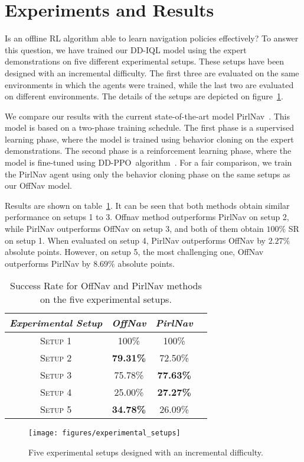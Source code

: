 \section{Experiments and Results}\label{sec:experiments}

Is an offline RL algorithm able to learn navigation policies effectively?
To answer this question, we have trained our DD-IQL model using the expert demonstrations on five different experimental setups.
These setups have been designed with an incremental difficulty.
The first three are evaluated on the same environments in which the agents were trained, while the last two are evaluated on different environments.
The details of the setups are depicted on figure~\ref{fig:setups}.

We compare our results with the current state-of-the-art model PirlNav~\cite{ramrakhya2023}.
This model is based on a two-phase training schedule.
The first phase is a supervised learning phase, where the model is trained using behavior cloning on the expert demonstrations.
The second phase is a reinforcement learning phase, where the model is fine-tuned using DD-PPO~algorithm~\cite{wijmans2020}.
For a fair comparison, we train the PirlNav agent using only the behavior cloning phase on the same setups as our OffNav model.

Results are shown on table~\ref{tab:success}.
It can be seen that both methods obtain similar performance on setups 1 to 3.
Offnav method outperforms PirlNav on setup 2, while PirlNav outperforms OffNav on setup 3, and both of them obtain $100\%$ SR on setup 1.
When evaluated on setup 4, PirlNav outperforms OffNav by $2.27\%$ absolute points.
However, on setup 5, the most challenging one, OffNav outperforms PirlNav by $8.69\%$ absolute points.


\begin{table}
    \centering
    \begin{tabular}{c|ccc}
        \toprule
        \textit{Experimental Setup} & \textit{OffNav}  & \textit{PirlNav} \\
        \midrule
        \textsc{Setup 1}            & 100\%          & 100\%   \\
        \textsc{Setup 2}            & \textbf{79.31\%} & 72.50\%          \\
        \textsc{Setup 3}            & 75.78\%          & \textbf{77.63\%} \\
        \textsc{Setup 4}            & 25.00\%          & \textbf{27.27\%} \\
        \textsc{Setup 5}            & \textbf{34.78\%} & 26.09\%          \\
        \bottomrule
    \end{tabular}
    \caption{Success Rate for OffNav and PirlNav methods on the five experimental setups.}
    \label{tab:success}
\end{table}

\begin{figure}
    \centering
    \texttt{[image: figures/experimental\_setups]}
    \caption{Five experimental setups designed with an incremental difficulty.}
    \label{fig:setups}
\end{figure}




